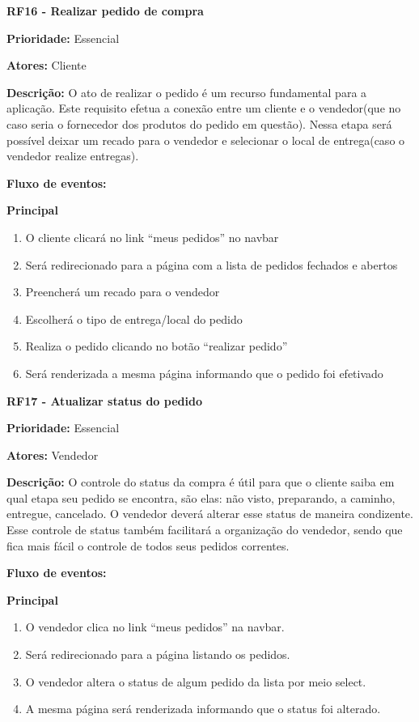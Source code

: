 \begin{apendicesenv}
\textbf{RF16 - Realizar pedido de compra} \par
\textbf{Prioridade:} Essencial \par
\textbf{Atores:} Cliente \par
\textbf{Descrição:} O ato de realizar o pedido é um recurso fundamental para a aplicação. Este requisito efetua a conexão entre um cliente e o vendedor(que no caso seria o fornecedor dos produtos do pedido em questão). Nessa etapa será possível deixar um recado para o vendedor e selecionar o local de entrega(caso o vendedor realize entregas). \par
\textbf{Fluxo de eventos:} \par
\textbf{Principal} \par
\begin{enumerate}
  \item O cliente clicará no link “meus pedidos” no navbar
  \item Será redirecionado para a página com a lista de pedidos fechados e abertos
  \item Preencherá um recado para o vendedor
  \item Escolherá o tipo de entrega/local do pedido
  \item Realiza o pedido clicando no botão “realizar pedido”
  \item Será renderizada a mesma página informando que o pedido foi efetivado
\end{enumerate}

\textbf{RF17 - Atualizar status do pedido} \par
\textbf{Prioridade:} Essencial \par
\textbf{Atores:} Vendedor \par
\textbf{Descrição:} O controle do status da compra é útil para que o cliente saiba em qual etapa seu pedido se encontra, são elas: não visto, preparando, a caminho, entregue, cancelado. O vendedor deverá alterar esse status de maneira condizente. Esse controle de status também facilitará a organização do vendedor, sendo que fica mais fácil o controle de todos seus pedidos correntes. \par
\textbf{Fluxo de eventos:} \par
\textbf{Principal} \par
\begin{enumerate}
  \item O vendedor clica no link “meus pedidos” na navbar.
  \item Será redirecionado para a página listando os pedidos.
  \item O vendedor altera o status de algum pedido da lista por meio select.
  \item A mesma página será renderizada informando que o status foi alterado.
\end{enumerate}


\end{apendicesenv}
